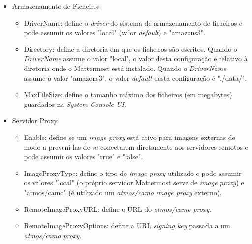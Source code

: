 \begin{itemize}
    \item Armazenamento de Ficheiros
    
    \begin{itemize}
        \item DriverName: define o \textit{driver} do sistema de armazenamento de ficheiros e pode assumir os valores "local" (valor \textit{default}) e "amazons3".
        \\
        \item Directory: define a diretoria em que os ficheiros são escritos. Quando o \textit{DriverName} assume o valor "local", o valor desta configuração é relativo à diretoria onde o Mattermost está instalado.
        Quando o \textit{DriverName} assume o valor "amazons3", o valor \textit{default} desta configuração é "./data/". 
        \\
        \item MaxFileSize: define o tamanho máximo dos ficheiros (em megabytes) guardados na \textit{System Console UI}.
    \end{itemize}
    
    \clearpage
    
    \item Servidor Proxy
    
    \begin{itemize}
        \item Enable: define se um \textit{image proxy} está ativo para imagens externas de modo a preveni-las de se conectarem diretamente aos servidores remotos e pode assumir os valores "true" e "false".
        \\
        \item ImageProxyType: define o tipo do \textit{image proxy} utilizado e pode assumir os valores "local" (o próprio servidor Mattermost serve de \textit{image proxy}) e "atmos/camo" (é utilizado um \textit{atmos/camo image proxy} externo).
        \\
        \item RemoteImageProxyURL: define o URL do \textit{atmos/camo proxy}.
        \\
        \item RemoteImageProxyOptions: define a URL \textit{signing key} passada a um \textit{atmos/camo proxy}.
    \end{itemize}
    
\end{itemize}